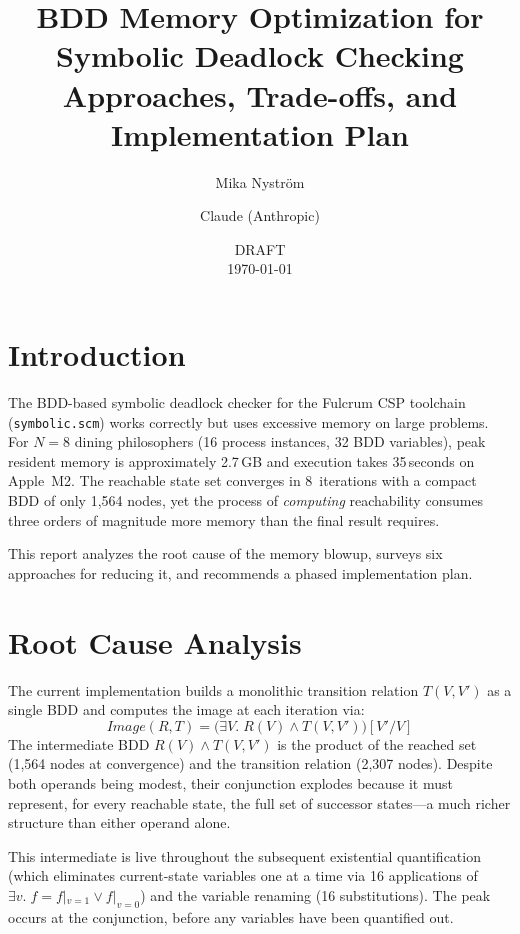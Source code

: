 \documentclass[11pt]{article}
\title{\textbf{BDD Memory Optimization for Symbolic Deadlock Checking} \\[0.5em]
\large Approaches, Trade-offs, and Implementation Plan}
\author{Mika Nystr\"om \and Claude (Anthropic)}
\date{DRAFT\\
\today}
\begin{document}
\maketitle

\tableofcontents
\newpage

\section{Introduction}

The BDD-based symbolic deadlock checker for the Fulcrum CSP toolchain
(\texttt{symbolic.scm}) works correctly but uses excessive memory on
large problems.  For $N = 8$ dining philosophers (16 process instances,
32 BDD variables), peak resident memory is approximately 2.7\,GB and
execution takes 35\,seconds on Apple~M2.  The reachable state set
converges in 8~iterations with a compact BDD of only 1,564 nodes, yet
the process of \emph{computing} reachability consumes three orders of
magnitude more memory than the final result requires.

This report analyzes the root cause of the memory blowup, surveys six
approaches for reducing it, and recommends a phased implementation plan.

\section{Root Cause Analysis}

The current implementation builds a monolithic transition relation
$T(V, V')$ as a single BDD and computes the image at each iteration via:
%
\begin{equation}
\mathit{Image}(R, T) =
  \bigl(\exists V.\; R(V) \wedge T(V, V')\bigr)[V'/V]
\label{eq:image}
\end{equation}
%
The intermediate BDD $R(V) \wedge T(V, V')$ is the product of the
reached set (1,564 nodes at convergence) and the transition relation
(2,307 nodes).  Despite both operands being modest, their conjunction
explodes because it must represent, for every reachable state, the
full set of successor states---a much richer structure than either
operand alone.

This intermediate is live throughout the subsequent existential
quantification (which eliminates current-state variables one at a time
via 16 applications of $\exists v.\; f = f|_{v=1} \vee f|_{v=0}$)
and the variable renaming (16 substitutions).  The peak occurs at
the conjunction, before any variables have been quantified out.
\end{document}
